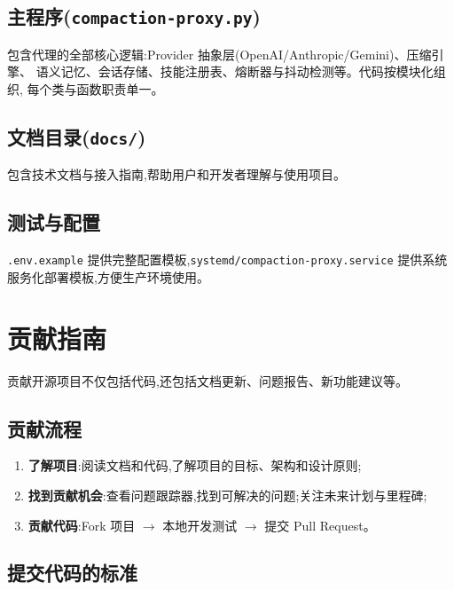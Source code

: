 \documentclass[11pt,a4paper]{article}
\begin{document}
\subsection{主程序(\texttt{compaction-proxy.py})}

包含代理的全部核心逻辑:Provider 抽象层(OpenAI/Anthropic/Gemini)、压缩引擎、
语义记忆、会话存储、技能注册表、熔断器与抖动检测等。代码按模块化组织,
每个类与函数职责单一。

\subsection{文档目录(\texttt{docs/})}

包含技术文档与接入指南,帮助用户和开发者理解与使用项目。

\subsection{测试与配置}

\texttt{.env.example} 提供完整配置模板,\texttt{systemd/compaction-proxy.service}
提供系统服务化部署模板,方便生产环境使用。

\section{贡献指南}

贡献开源项目不仅包括代码,还包括文档更新、问题报告、新功能建议等。

\subsection{贡献流程}

\begin{enumerate}[leftmargin=2em]
  \item \textbf{了解项目}:阅读文档和代码,了解项目的目标、架构和设计原则;
  \item \textbf{找到贡献机会}:查看问题跟踪器,找到可解决的问题;关注未来计划与里程碑;
  \item \textbf{贡献代码}:Fork 项目 $\rightarrow$ 本地开发测试 $\rightarrow$ 提交 Pull Request。
\end{enumerate}

\subsection{提交代码的标准}
\end{document}
